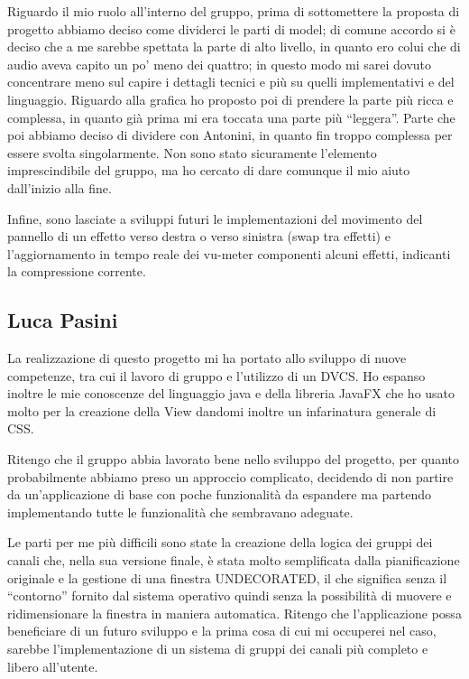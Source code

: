 \documentclass[a4paper,12pt]{report}
\begin{document}
Riguardo il mio ruolo all’interno del gruppo, prima di sottomettere la proposta di progetto abbiamo deciso come dividerci le parti di model; di comune accordo si è deciso che a me sarebbe spettata la parte di alto livello, in quanto ero colui che di audio aveva capito un po' meno dei quattro; in questo modo mi sarei dovuto concentrare meno sul capire i dettagli tecnici e più su quelli implementativi e del linguaggio. Riguardo alla grafica ho proposto poi di prendere la parte più ricca e complessa, in quanto già prima mi era toccata una parte più “leggera”. Parte che poi abbiamo deciso di dividere con Antonini, in quanto fin troppo complessa per essere svolta singolarmente. Non sono stato sicuramente l’elemento imprescindibile del gruppo, ma ho cercato di dare comunque il mio aiuto dall’inizio alla fine.

Infine, sono lasciate a sviluppi futuri le implementazioni del movimento del pannello di un effetto verso destra o verso sinistra (swap tra effetti) e l’aggiornamento in tempo reale dei vu-meter componenti alcuni effetti, indicanti la compressione corrente.
\endsubsection
\subsection{Luca Pasini}
La realizzazione di questo progetto mi ha portato allo sviluppo di nuove competenze, tra cui il lavoro di gruppo e l’utilizzo di un DVCS.  Ho espanso inoltre le mie conoscenze del linguaggio java e della libreria JavaFX che ho usato molto per la creazione della View dandomi inoltre un infarinatura generale di CSS. 

Ritengo che il gruppo abbia lavorato bene nello sviluppo del progetto, per quanto probabilmente abbiamo preso un approccio complicato, decidendo di non partire da un'applicazione di base con poche funzionalità da espandere ma partendo implementando tutte le funzionalità che sembravano adeguate.

Le parti per me più difficili sono state la creazione della logica dei gruppi dei canali che, nella sua versione finale, è stata molto semplificata dalla pianificazione originale e la gestione di una finestra UNDECORATED, il che significa senza il “contorno” fornito dal sistema operativo quindi senza la possibilità di muovere e ridimensionare la finestra in maniera automatica.
Ritengo che l’applicazione possa beneficiare di un futuro sviluppo e la prima cosa di cui mi occuperei nel caso, sarebbe l’implementazione di un sistema di gruppi dei canali più completo e libero all’utente.
\endsubsection
\end{document}
